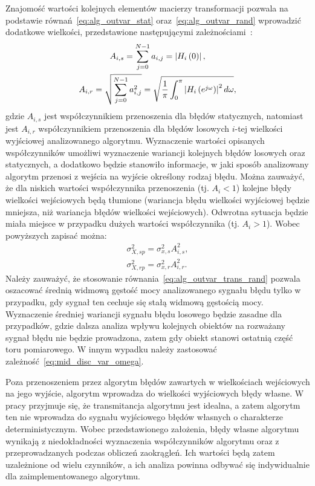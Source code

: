 Znajomość wartości kolejnych elementów macierzy transformacji pozwala na podstawie równań~\eqref{eq:alg_outvar_stat} oraz~\eqref{eq:alg_outvar_rand} wprowadzić dodatkowe wielkości, przedstawione następującymi zależnościami~\cite{jakubiec_algorithms, oppenheim_dsp, proakis_dsp}:
\begin{gather}
A_{i,s} = \sum _{j = 0} ^{N-1} a_{i, j} = \left| H_{i} \left(0\right) \right| \label{eq:alg_trans_stat}, \\
A_{i,r} = \sqrt{\sum _{j = 0} ^{N-1} a_{i, j}^{2}} = \sqrt{\frac{1}{\pi} \int _{0} ^{\pi} \left| H_{i} \left(e^{j \omega}\right) \right|^{2} d\omega} \label{eq:alg_trans_rand},
\end{gather}
gdzie $A_{i,s}$ jest współczynnikiem przenoszenia dla błędów statycznych, natomiast jest $A_{i,r}$ współczynnikiem przenoszenia dla błędów losowych $i$-tej wielkości wyjściowej analizowanego algorytmu. Wyznaczenie wartości opisanych współczynników umożliwi wyznaczenie wariancji kolejnych błędów losowych oraz statycznych, a dodatkowo będzie stanowiło informacje, w jaki sposób analizowany algorytm przenosi z wejścia na wyjście określony rodzaj błędu. Można zauważyć, że dla niskich wartości współczynnika przenoszenia (tj. $A_{i} < 1$) kolejne błędy wielkości wejściowych będą tłumione (wariancja błędu wielkości wyjściowej będzie mniejsza, niż wariancja błędów wielkości wejściowych). Odwrotna sytuacja będzie miała miejsce w przypadku dużych wartości współczynnika (tj. $A_{i} > 1$). Wobec powyższych zapisać można:
\begin{gather}
\sigma_{X,sp}^{2} = \sigma_{x,s}^{2} A_{i,s}^{2} \label{eq:alg_outvar_trans_stat}, \\
\sigma_{X,rp}^{2} = \sigma_{x,r}^{2} A_{i,r}^{2} \label{eq:alg_outvar_trans_rand}.
\end{gather}
Należy zauważyć, że stosowanie równania~\eqref{eq:alg_outvar_trans_rand} pozwala oszacować średnią widmową gęstość mocy analizowanego sygnału błędu tylko w przypadku, gdy sygnał ten cechuje się stałą widmową gęstością mocy. Wyznaczenie średniej wariancji sygnału błędu losowego będzie zasadne dla przypadków, gdzie dalsza analiza wpływu kolejnych obiektów na rozważany sygnał błędu nie będzie prowadzona, zatem gdy obiekt stanowi ostatnią część toru pomiarowego. W innym wypadku należy zastosować zależność~\eqref{eq:mid_disc_var_omega}.

Poza przenoszeniem przez algorytm błędów zawartych w wielkościach wejściowych na jego wyjście, algorytm wprowadza do wielkości wyjściowych błędy własne. W pracy przyjmuje się, że transmitancja algorytmu jest idealna, a zatem algorytm ten nie wprowadza do sygnału wyjściowego błędów własnych o charakterze deterministycznym. Wobec przedstawionego założenia, błędy własne algorytmu wynikają z niedokładności wyznaczenia współczynników algorytmu oraz z przeprowadzanych podczas obliczeń zaokrągleń. Ich wartości będą zatem uzależnione od wielu czynników, a ich analiza powinna odbywać się indywidualnie dla zaimplementowanego algorytmu.


